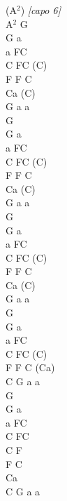 \documentclass[a5paper, 10pt]{book}
\begin{document}
\begin{minipage}[t]{0.15\textwidth}
  (A$^2$) {\scriptsize \textit{[capo 6]}}\\
  A$^2$ G \\
  G a\\
  a FC\\
  C FC (C)\\
  F F C\\
  Ca (C)\\
  G a a\\

  G \\
  G a\\
  a FC\\
  C FC (C)\\
  F F C\\
  Ca (C)\\
  G a a\\

  G \\
  G a\\
  a FC\\
  C FC (C)\\
  F F C\\
  Ca (C)\\
  G a a\\

  G \\
  G a\\
  a FC\\
  C FC (C)\\
  F F C (Ca)\\
  C G a a\\

  G \\
  G a\\
  a FC\\
  C FC\\
  C F\\
  F C\\
  Ca\\
  C G a a\\

\end{minipage}

\newpage
\end{document}
